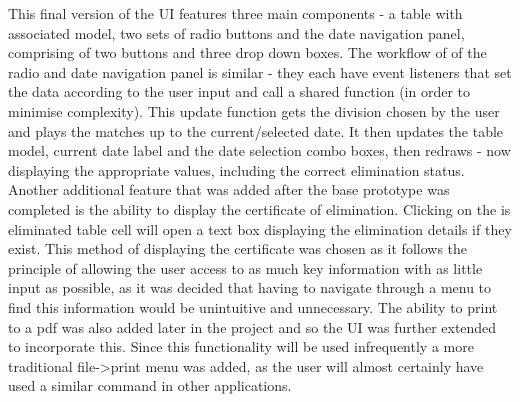 This final version of the UI features three main components - a table with associated model, 
two sets of radio buttons and the date navigation panel, comprising of two buttons and three
drop down boxes. The workflow of of the radio and date navigation panel is similar - they each
have event listeners that set the data according to the user input and call a shared function 
(in order to minimise complexity). This update function gets the division chosen
by the user and plays the matches up to the current/selected date. It then updates the table 
model, current date label and the date selection combo boxes, then redraws - now displaying the 
appropriate values, including the correct elimination status. Another additional feature that was
added after the base prototype was completed is the ability to display the certificate of elimination.
Clicking on the is eliminated table cell will open a text box displaying the elimination details 
if they exist. This method of displaying the certificate was chosen as it follows the principle 
of allowing the user access to as much key information with as little input as possible, as it
was decided that having to navigate through a menu to find this information would be unintuitive and 
unnecessary. The ability to print to a pdf was also added later in the project and so the 
UI was further extended to incorporate this. Since this functionality will be
used infrequently a more traditional file->print menu was added, as the user will almost certainly
have used a similar command in other applications.